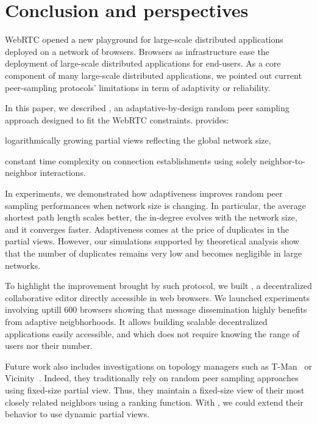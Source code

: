
\section{Conclusion and perspectives}
\label{sec:conclusion}


WebRTC opened a new playground for large-scale distributed applications
deployed on a network of browsers. Browsers as infrastructure ease the
deployment of large-scale distributed applications for end-users. As a core
component of many large-scale distributed applications, we pointed out current
peer-sampling protocols' limitations in term of adaptivity or reliability.

In this paper, we described \SPRAY, an adaptative-by-design random peer
sampling approach designed to fit the WebRTC constraints.  \SPRAY provides:
\begin{inparaenum}[(i)]
\item logarithmically growing partial views reflecting the global network size,
\item constant time complexity on connection establishments using solely
  neighbor-to-neighbor interactions.
\end{inparaenum}
In experiments, we demonstrated how \SPRAY adaptiveness improves random peer
sampling performances when network size is changing. In particular, the average
shortest path length scales better, the in-degree evolves with the network size,
and it converges faster.  Adaptiveness comes at the price of duplicates in the
partial views. However, our simulations supported by theoretical analysis show
that the number of duplicates remains very low and becomes negligible in large
networks.

To highlight the improvement brought by such protocol, we built \CRATE, a
decentralized collaborative editor directly accessible in web browsers. We
launched experiments involving uptill 600 browsers showing that message
dissemination highly benefits from adaptive neigbhorhoods. It allows building
scalable decentralized applications easily accessible, and which does not
require knowing the range of users nor their number.

Future work also includes investigations on topology managers such as
T-Man~\cite{jelasity2009tman} or Vicinity~\cite{voulgaris2005epidemic}. Indeed,
they traditionally rely on random peer sampling approaches using fixed-size
partial view. Thus, they maintain a fixed-size view of their most closely
related neighbors using a ranking function. With \SPRAY, we could extend their
behavior to use dynamic partial views.

